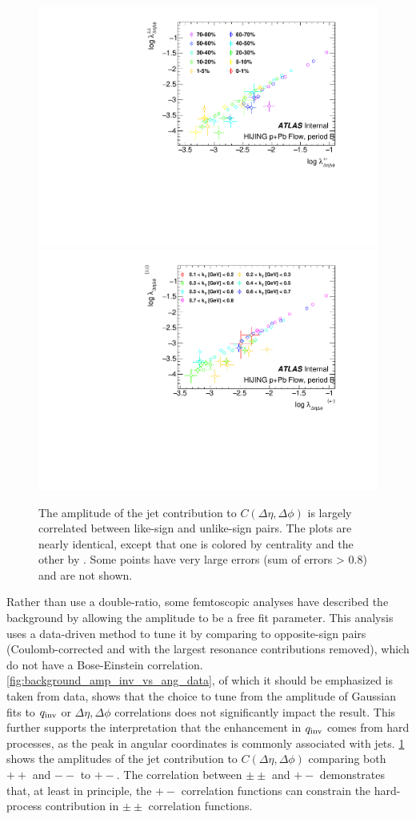 \begin{figure}[t]
\centering
\includegraphics[width=.49\linewidth]{ang_lambda_opp_vs_same_MC.pdf}
\includegraphics[width=.49\linewidth]{ang_lambda_kt_opp_vs_same_MC.pdf}
\caption{The amplitude of the jet contribution to $C(\Delta\eta, \Delta\phi)$ is largely correlated between like-sign and unlike-sign pairs. The plots are nearly identical, except that one is colored by centrality and the other by \kt. Some points have very large errors (sum of errors > 0.8) and are not shown.}
\label{fig:background_ang_same_vs_opp_mc}
\end{figure}

Rather than use a double-ratio, some femtoscopic analyses have described the background by allowing the amplitude to be a free fit parameter.
This analysis uses a data-driven method to tune it by comparing to opposite-sign pairs (Coulomb-corrected and with the largest resonance contributions removed), which do not have a Bose-Einstein correlation.
\cref{fig:background_amp_inv_vs_ang_data}, of which it should be emphasized is taken from data, shows that the choice to tune from the amplitude of Gaussian fits to $q_{\mathrm{inv}}$ or $\Delta\eta, \Delta\phi$ correlations does not significantly impact the result.
This further supports the interpretation that the enhancement in $q_{\mathrm{inv}}$ comes from hard processes, as the peak in angular coordinates is commonly associated with jets.
\cref{fig:background_ang_same_vs_opp_mc} shows the amplitudes of the jet contribution to $C(\Delta\eta, \Delta\phi)$ comparing both $++$ and $--$ to $+-$.
The correlation between $\pm\pm$ and $+-$ demonstrates that, at least in principle, the $+-$ correlation functions can constrain the hard-process contribution in $\pm\pm$ correlation functions.

